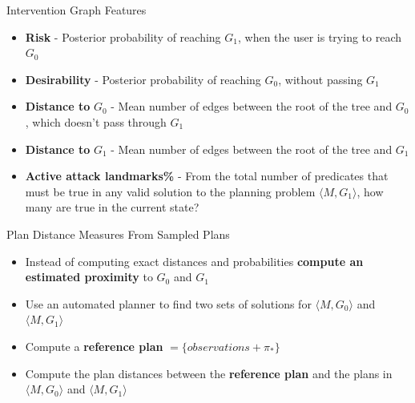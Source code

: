 \begin{frame} {Intervention Graph Features}
\begin{itemize}
\item \textbf{Risk} - Posterior probability of reaching $G_1$, when the user is trying to reach $G_0$
\item \textbf{Desirability} - Posterior probability of reaching $G_0$, without passing $G_1$
\item \textbf{Distance to} $G_0$ - Mean number of edges between the root of the tree and $G_0$, which doesn't pass through $G_1$
\item \textbf{Distance to} $G_1$ - Mean number of edges between the root of the tree and $G_1$
\item \textbf{Active attack landmarks\%} - From the total number of predicates that must be true in any valid solution to the planning problem $\langle M,G_1\rangle$, how many are true in the current state?
\end{itemize}

\end{frame}

\begin{frame} {Plan Distance Measures From Sampled Plans}
\begin{itemize}
\item Instead of computing exact distances and probabilities \textbf{compute an estimated proximity} to $G_0$ and $G_1$
\item Use an automated planner to find two sets of solutions for $\langle M, G_0\rangle$ and $\langle M, G_1 \rangle$
\item Compute a \textbf{reference plan} $ = \lbrace observations + \pi_* \rbrace$
\item Compute the plan distances between the  \textbf{reference plan} and the plans in $\langle M, G_0\rangle$ and $\langle M, G_1 \rangle$
\end{itemize}

\end{frame}